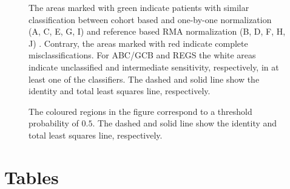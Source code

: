 \documentclass[twocolumn]{bmcart}%
\def\texttt{[image: ]}
\begin{document}
\begin{backmatter}
\begin{figure}[h!]
\caption{}
\label{fig:webtooldiagram}
\end{figure}

\begin{figure}[h!]
\caption{
The areas marked with green indicate patients with similar classification between cohort based and one-by-one normalization (A, C, E, G, I)  and reference based RMA normalization (B, D, F, H, J) .
Contrary, the areas marked with red indicate complete misclassifications.
For ABC/GCB and REGS the white areas indicate unclassified and intermediate sensitivity, respectively, in at least one of the classifiers.
The dashed and solid line show the identity and total least squares line, respectively.}
\label{fig:ABCGCBDrug}
\end{figure}


\begin{figure}[h!]
\caption{
The coloured regions in the figure correspond to a threshold probability of $0.5$.
The dashed and solid line show the identity and total least squares line, respectively.}
\label{fig:Bagscorr}
\end{figure}




\section*{Tables}


\end{backmatter}
\end{document}
